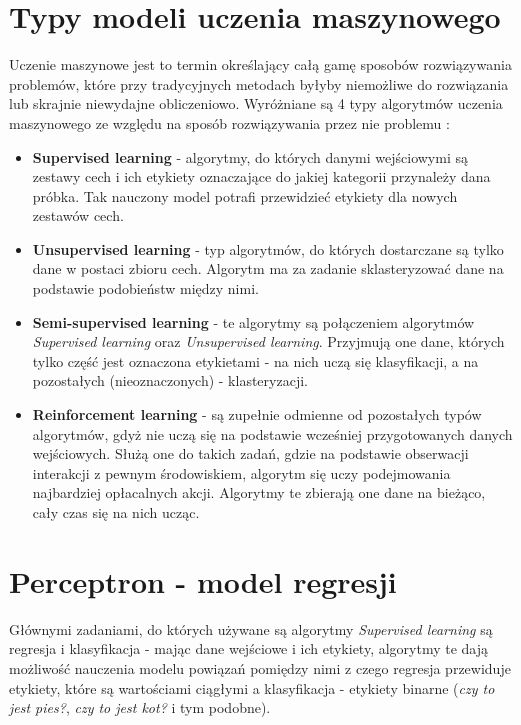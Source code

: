 \documentclass[12pt]{aghdpl}
\begin{document}
		\section{Typy modeli uczenia maszynowego}
		Uczenie maszynowe jest to termin określający całą gamę sposobów rozwiązywania problemów, które przy tradycyjnych metodach byłyby niemożliwe do rozwiązania lub skrajnie niewydajne obliczeniowo. Wyróżniane są 4 typy algorytmów uczenia maszynowego ze względu na sposób rozwiązywania przez nie problemu 	\cite{types_of_machine_learning_algorithms}:
		\begin{itemize}
		\item \textbf{Supervised learning} - algorytmy, do których danymi wejściowymi są zestawy cech i ich etykiety oznaczające do jakiej kategorii przynależy dana próbka. Tak nauczony model potrafi przewidzieć etykiety dla nowych zestawów cech.
		\item \textbf{Unsupervised learning} - typ algorytmów, do których dostarczane są tylko dane w postaci zbioru cech. Algorytm ma za zadanie sklasteryzować dane na podstawie podobieństw między nimi.
		\item \textbf{Semi-supervised learning} - te algorytmy są połączeniem algorytmów \textit{Supervised learning} oraz \textit{Unsupervised learning}. Przyjmują one dane, których tylko część jest oznaczona etykietami - na nich uczą się klasyfikacji, a na pozostałych (nieoznaczonych) - klasteryzacji.
		\item \textbf{Reinforcement learning} - są zupełnie odmienne od pozostałych typów algorytmów, gdyż nie uczą się na podstawie wcześniej przygotowanych danych wejściowych. Służą one do takich zadań, gdzie na podstawie obserwacji interakcji z pewnym środowiskiem, algorytm się uczy podejmowania najbardziej opłacalnych akcji. Algorytmy te zbierają one dane na bieżąco, cały czas się na nich ucząc.
		\end{itemize}
		
		\section{Perceptron - model regresji}
		Głównymi zadaniami, do których używane są algorytmy \textit{Supervised learning} są regresja i klasyfikacja - mając dane wejściowe i ich etykiety, algorytmy te dają możliwość nauczenia modelu powiązań pomiędzy nimi z czego regresja przewiduje etykiety, które są wartościami ciągłymi a klasyfikacja - etykiety binarne (\textit{czy to jest pies?}, \textit{czy to jest kot?} i tym podobne).
		
\end{document}

